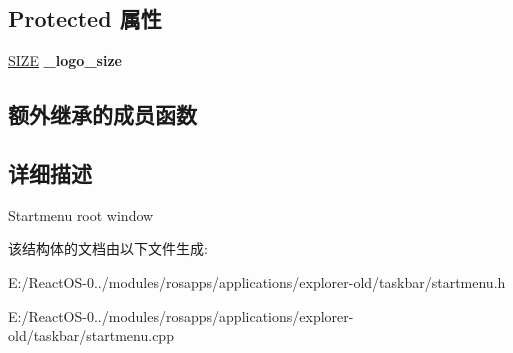 \subsection*{Protected 属性}
\begin{DoxyCompactItemize}
\item 
\mbox{\label{struct_start_menu_root_a9b3c1e5267c1acc807da0150dbe859d6}} 
\hyperlink{structtag_s_i_z_e}{S\+I\+ZE} {\bfseries \+\_\+logo\+\_\+size}
\end{DoxyCompactItemize}
\subsection*{额外继承的成员函数}


\subsection{详细描述}
Startmenu root window 

该结构体的文档由以下文件生成\+:\begin{DoxyCompactItemize}
\item 
E\+:/\+React\+O\+S-\/0../modules/rosapps/applications/explorer-\/old/taskbar/startmenu.\+h\item 
E\+:/\+React\+O\+S-\/0../modules/rosapps/applications/explorer-\/old/taskbar/startmenu.\+cpp\end{DoxyCompactItemize}
